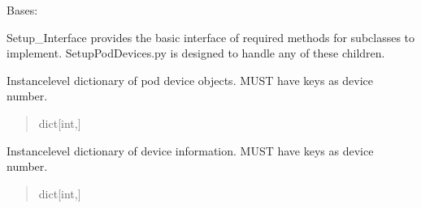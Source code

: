 \documentclass[letterpaper,10pt,english]{sphinxmanual}
\begin{document}
\begin{fulllineitems}
\label{\detokenize{Setup_PodInterface:Setup_PodInterface.Setup_Interface}}
\pysigstartsignatures
{}
\pysigstopsignatures
\sphinxAtStartPar
Bases: 

\sphinxAtStartPar
Setup\_Interface provides the basic interface of required methods for subclasses to implement.     SetupPodDevices.py is designed to handle any of these children.

\begin{fulllineitems}
\label{\detokenize{Setup_PodInterface:Setup_PodInterface.Setup_Interface._podDevices}}
\pysigstartsignatures
{}
\pysigstopsignatures
\sphinxAtStartPar
Instance\sphinxhyphen{}level dictionary of pod device objects. MUST have             keys as device number.
\begin{quote}\begin{description}
\sphinxAtStartPar
dict{[}int,{\hyperref[\detokenize{BasicPodProtocol:BasicPodProtocol.POD_Basics}]{}}{]}

\end{description}\end{quote}

\end{fulllineitems}


\begin{fulllineitems}
\label{\detokenize{Setup_PodInterface:Setup_PodInterface.Setup_Interface._podParametersDict}}
\pysigstartsignatures
{}
\pysigstopsignatures
\sphinxAtStartPar
Instance\sphinxhyphen{}level dictionary of device information. MUST have keys as device number.
\begin{quote}\begin{description}
\sphinxAtStartPar
dict{[}int,{\hyperref[\detokenize{Setup_PodParameters:Setup_PodParameters.Params_Interface}]{}}{]}


\end{description}
\end{quote}
\end{fulllineitems}
\end{fulllineitems}
\end{document}
